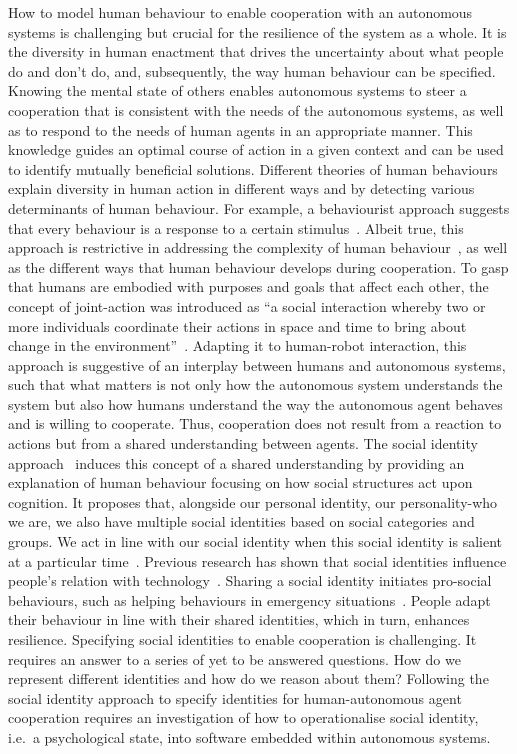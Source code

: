 \documentclass[sigconf]{acmart}
\begin{document}
How to model human behaviour to enable cooperation with an autonomous systems is challenging but crucial for the resilience of the system as a whole. It is the diversity in human enactment that drives the uncertainty about what people do and don’t do, and, subsequently, the way human behaviour can be specified. Knowing the mental state of others enables autonomous systems to steer a cooperation that is consistent with the needs of the autonomous systems, as well as to respond to the needs of human agents in an appropriate manner. This knowledge guides an optimal course of action in a given context and can be used to identify mutually beneficial solutions. 
Different theories of human behaviours explain diversity in human action in different ways and by detecting various determinants of human behaviour. For example, a behaviourist approach suggests that every behaviour is a response to a certain stimulus~\cite{heimlich2008understanding}. Albeit true, this approach is restrictive in addressing the complexity of human behaviour~\cite{taylor2021explanation}, as well as the different ways that human behaviour develops during cooperation. To gasp that humans are embodied with purposes and goals that affect each other, the concept of joint-action was introduced as ``a social interaction whereby two or more individuals coordinate their actions in space and time to bring about change in the environment''~\cite{sebanz2006joint}. Adapting it to human-robot interaction, this approach is suggestive of an interplay between humans and autonomous systems, such that what matters is not only how the autonomous system understands the system but also how humans understand the way the autonomous agent behaves and is willing to cooperate. Thus, cooperation does not result from a reaction to actions but from a shared understanding between agents. 
The social identity approach~\cite{spears2021social} induces this concept of a shared understanding by providing an explanation of human behaviour focusing on how social structures act upon cognition. It proposes that, alongside our personal identity, our personality-who we are, we also have multiple social identities based on social categories and groups. We act in line with our social identity when this social identity is salient at a particular time~\cite{tajfel1982social}. Previous research has shown that social identities influence people’s relation with technology~\cite{lee2001effect}. Sharing a social identity initiates pro-social behaviours, such as helping behaviours in emergency situations~\cite{drury2018role}. People adapt their behaviour in line with their shared identities, which in turn, enhances resilience. Specifying social identities to enable cooperation is challenging. It requires an answer to a series of yet to be answered questions. How do we represent different identities and how do we reason about them? Following the social identity approach to specify identities for human-autonomous agent cooperation requires an investigation of how to operationalise social identity, i.e.~a psychological state, into software embedded within autonomous systems.
\end{document}
